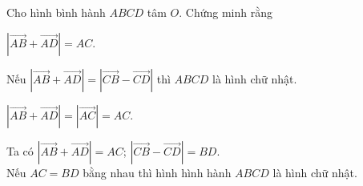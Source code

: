 \begin{bt}%
    Cho hình bình hành $ABCD$ tâm $O$. Chứng minh rằng
    \begin{listEX}[1]
        \item $\left|\overrightarrow{AB} + \overrightarrow{AD}\right|=AC$.
        \item Nếu $\left|\overrightarrow{AB} + \overrightarrow{AD}\right|=\left|\overrightarrow{CB}- \overrightarrow{CD}\right|$ thì $ABCD$ là hình chữ nhật.
    \end{listEX}
    \loigiai
    {
    \immini
    {
        \begin{listEX}[1]
        \item $\left|\overrightarrow{AB} + \overrightarrow{AD}\right|=\left|\overrightarrow{AC}\right|=AC$.
        \item Ta có $\left|\overrightarrow{AB} + \overrightarrow{AD}\right|=AC$; $\left|\overrightarrow{CB}- \overrightarrow{CD}\right|=BD$.\\ 
        Nếu $AC=BD$ bằng nhau thì hình hình hành $ABCD$ là hình chữ nhật.
    \end{listEX}
    }
    {
    }
    }
\end{bt}


